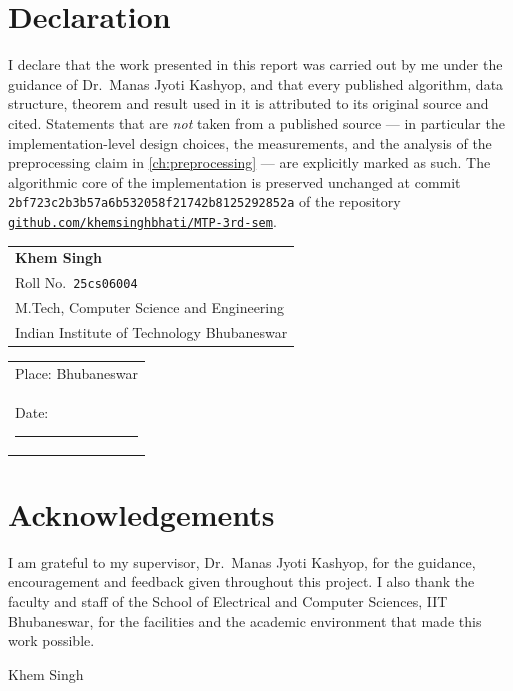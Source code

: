 \documentclass[11pt,a4paper,oneside]{report}
\theoremstyle{plain}
\theoremstyle{definition}
\theoremstyle{remark}
\newcommand{\repo}{\href{https://github.com/khemsinghbhati/MTP-3rd-sem}{\nolinkurl{github.com/khemsinghbhati/MTP-3rd-sem}}}
\begin{document}
\chapter*{Declaration}
\thispagestyle{plain}
\noindent I declare that the work presented in this report was carried out by me under the
guidance of Dr.\ Manas Jyoti Kashyop, and that every published algorithm, data structure,
theorem and result used in it is attributed to its original source and cited. Statements that
are \emph{not} taken from a published source --- in particular the implementation-level design
choices, the measurements, and the analysis of the preprocessing claim in
\cref{ch:preprocessing} --- are explicitly marked as such. The algorithmic core of the
implementation is preserved unchanged at commit
\texttt{2bf723c2b3b57a6b532058f21742b8125292852a} of the repository \repo.

\vspace{15mm}
\noindent\begin{tabular}{@{}l@{}}
\textbf{Khem Singh}\\
Roll No.\ \texttt{25cs06004}\\
M.Tech, Computer Science and Engineering\\
Indian Institute of Technology Bhubaneswar
\end{tabular}
\hfill
\begin{tabular}{@{}l@{}}
Place: Bhubaneswar\\
Date: \rule{34mm}{0.4pt}
\end{tabular}

\chapter*{Acknowledgements}
\thispagestyle{plain}
I am grateful to my supervisor, Dr.\ Manas Jyoti Kashyop, for the guidance, encouragement
and feedback given throughout this project. I also thank the faculty and staff of the School of
Electrical and Computer Sciences, IIT Bhubaneswar, for the facilities and the academic
environment that made this work possible.

\vspace{10mm}
\hfill Khem Singh

\end{document}
